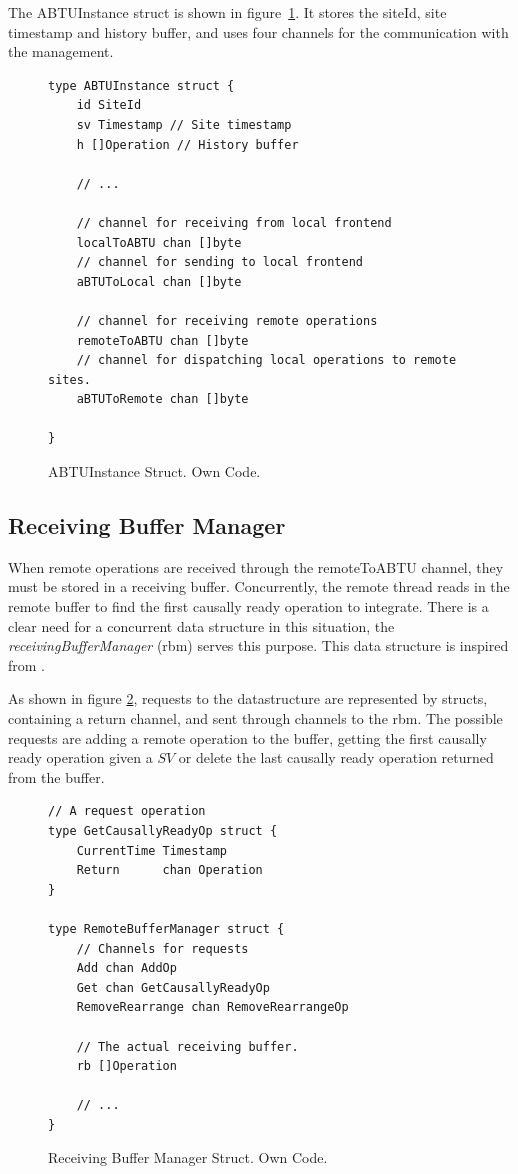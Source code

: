 \documentclass[11pt, a4paper, oneside, openright]{article} %
\begin{document}
The ABTUInstance struct is shown in figure~\ref{code:ABTUInstance}. It stores the siteId, site timestamp and history buffer, and uses four channels for the communication with the management.

\begin{figure}[!h]
\begin{center}
\begin{lstlisting}
type ABTUInstance struct {
	id SiteId
	sv Timestamp // Site timestamp
	h []Operation // History buffer
	
	// ...

	// channel for receiving from local frontend
	localToABTU chan []byte 
	// channel for sending to local frontend
	aBTUToLocal chan []byte

	// channel for receiving remote operations
	remoteToABTU chan []byte 
	// channel for dispatching local operations to remote sites.
	aBTUToRemote chan []byte

}
\end{lstlisting}
\end{center}
\caption{ABTUInstance Struct. Own Code.\label{code:ABTUInstance}}
\end{figure}

\subsection{Receiving Buffer Manager}

When remote operations are received through the remoteToABTU channel, they must be stored in a receiving buffer. Concurrently, the remote thread reads in the remote buffer to find the first causally ready operation to integrate. There  is a clear need for a concurrent data structure in this situation,  the \textit{receivingBufferManager} (rbm) serves this purpose. This data structure is inspired from \cite{datastruct}.

As shown in figure \ref{code:rbm1}, requests to the datastructure are represented by structs, containing a return channel, and sent through channels to the rbm. The possible requests are adding a remote operation to the buffer, getting the first causally ready operation given a $SV$ or delete the last causally ready operation returned from the buffer.

\begin{figure}[!h]
\begin{center}
\begin{lstlisting}
// A request operation
type GetCausallyReadyOp struct {
	CurrentTime Timestamp
	Return      chan Operation
}

type RemoteBufferManager struct {
	// Channels for requests
	Add chan AddOp
	Get chan GetCausallyReadyOp
	RemoveRearrange chan RemoveRearrangeOp

	// The actual receiving buffer.
	rb []Operation

	// ...
}
\end{lstlisting}
\end{center}
\caption{Receiving Buffer Manager Struct. Own Code.\label{code:rbm1}}
\end{figure}
\end{document}
